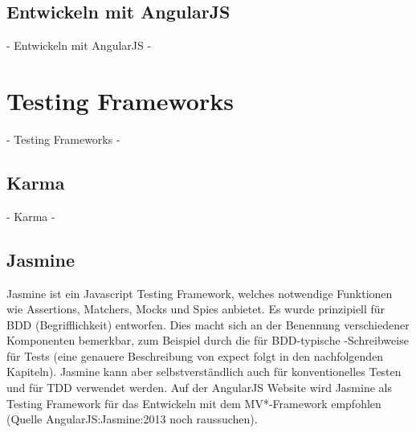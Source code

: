 {\subsection{Entwickeln mit AngularJS}
 - Entwickeln mit AngularJS -

\newpage
\section{Testing Frameworks}
 - Testing Frameworks -

\subsection{Karma}
 - Karma -

\subsection{Jasmine}
Jasmine ist ein Javascript Testing Framework, welches notwendige Funktionen wie Assertions, Matchers, Mocks und Spies anbietet. Es wurde prinzipiell für BDD (Begrifflichkeit) entworfen. Dies macht sich an der Benennung verschiedener Komponenten bemerkbar, zum Beispiel durch die für BDD-typische -Schreibweise für Tests (eine genauere Beschreibung von expect folgt in den nachfolgenden Kapiteln). Jasmine kann aber selbstverständlich auch für konventionelles Testen und für TDD verwendet werden. Auf der AngularJS Website wird Jasmine als Testing Framework für das Entwickeln mit dem MV*-Framework empfohlen (Quelle {AngularJS:Jasmine:2013} noch raussuchen).

}
